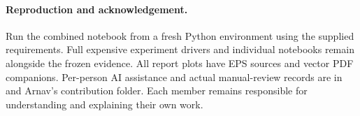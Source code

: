 \documentclass[a4paper,11pt]{article}
\theoremstyle{remark}\newtheorem{remark}{Remark}
\begin{document}
\paragraph{Reproduction and acknowledgement.}
Run the combined notebook  from a fresh Python
environment using the supplied requirements. Full expensive experiment drivers and
individual notebooks remain alongside the frozen evidence. All report plots have EPS
sources and vector PDF companions. Per-person AI assistance and actual manual-review
records are in  and Arnav's contribution folder.
Each member remains responsible for understanding and explaining their own work.
\clearpage
\end{document}
